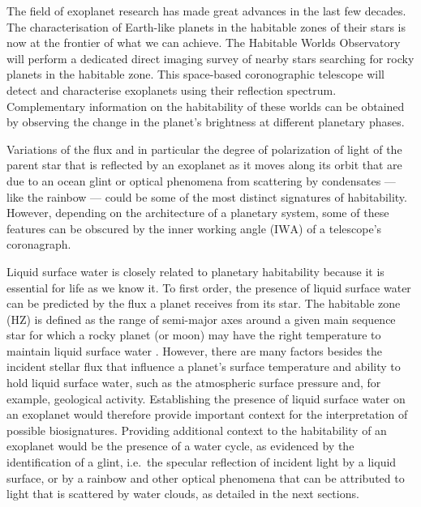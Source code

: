 \documentclass[
    usenatbib,
]{mnras}
\newcommand{\IWA}{\ensuremath{\mathrm{IWA}}}
\begin{document}

The field of exoplanet research has made great advances in the last few decades. The characterisation of Earth-like planets in the habitable zones of their stars is now at the frontier of what we can achieve. The Habitable Worlds Observatory will perform a dedicated direct imaging survey of nearby stars searching for rocky planets in the habitable zone. This space-based coronographic telescope will detect and characterise exoplanets using their reflection spectrum. Complementary information on the habitability of these worlds can be obtained by observing the change in the planet's brightness at different planetary phases.

Variations of the flux and in particular the degree of polarization of
light of the parent star that is reflected by an exoplanet as it moves
along its orbit that are due to an ocean glint or optical phenomena from scattering by condensates --- like the rainbow --- could be some of the most distinct signatures of habitability.
%
However, depending on the architecture of a planetary system, some of these features can be obscured by the inner working angle (\IWA{}) of a telescope's coronagraph.

Liquid surface water is closely related to planetary habitability because it is essential for life as we know it.
%
To first order, the presence of liquid surface water can be predicted by the flux a planet receives from its star.
%
The habitable zone (HZ) is defined as the range of semi-major axes around a given main sequence star for which a rocky planet (or moon) may have the right temperature to maintain liquid surface water \citep{kasting93}. 
%
However, there are many factors besides the incident stellar flux that influence a planet's surface temperature and ability to hold liquid surface water, such as the atmospheric surface pressure and, for example, geological activity. 
%
Establishing the presence of liquid surface water on an exoplanet would therefore provide important context for the interpretation of possible biosignatures.
%
Providing additional context to the habitability of an exoplanet would be the presence of a water cycle, as evidenced by the identification of a glint, i.e.\ the specular reflection of incident light by a liquid surface, or by a rainbow and other optical phenomena that can be attributed to light that is scattered by water clouds, as detailed in the next sections.

\end{document}
